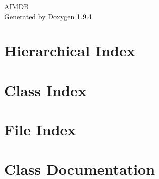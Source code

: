 \documentclass[twoside]{book}
\newcommand{\+}{\discretionary{\mbox{\scriptsize$\hookleftarrow$}}{}{}}
\newcommand{\clearemptydoublepage}{%
    \newpage{\pagestyle{empty}\cleardoublepage}%
  }
\begin{document}
  \raggedbottom
    \hypersetup{pageanchor=false,
                bookmarksnumbered=true,
                pdfencoding=unicode
               }
  \begin{titlepage}
  \vspace*{7cm}
  \begin{center}%
  {\Large AIMDB}\\
  \vspace*{1cm}
  {\large Generated by Doxygen 1.9.4}\\
  \end{center}
  \end{titlepage}
  \clearemptydoublepage
  \tableofcontents
  \clearemptydoublepage
  \hypersetup{pageanchor=true}
\chapter{Hierarchical Index}

\chapter{Class Index}

\chapter{File Index}

\chapter{Class Documentation}























































\end{document}
